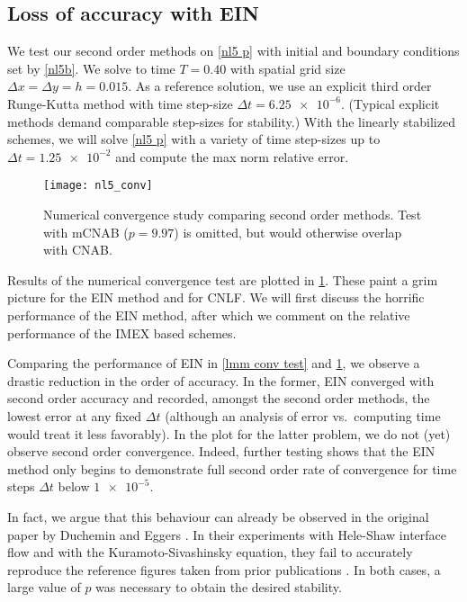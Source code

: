 \subsection{Loss of accuracy with EIN}
We test our second order methods on \cref{nl5 p} with initial and boundary conditions set by \cref{nl5b}. We solve to time $T=0.40$ with spatial grid size $\Delta x = \Delta y = h =0.015$. As a reference solution, we use an explicit third order Runge-Kutta method with time step-size $\Delta t=\num{6.25e-6}$. (Typical explicit methods demand comparable step-sizes for stability.) With the linearly stabilized schemes, we will solve \cref{nl5 p} with a variety of time step-sizes up to $\Delta t = \num{1.25e-2}$ and compute the max norm relative error.

\begin{figure}[htb!]
        \centering
\texttt{[image: nl5\_conv]}
\caption[Numerical convergence study comparing second order methods]{Numerical convergence study comparing second order methods. Test with mCNAB ($p=9.97$) is omitted, but would otherwise overlap with CNAB.}
\label{fig:nl5 conv}
\end{figure}

Results of the numerical convergence test are plotted in \cref{fig:nl5 conv}. These paint a grim picture for the EIN method and for CNLF. We will first discuss the horrific performance of the EIN method, after which we comment on the relative performance of the IMEX based schemes. 

Comparing the performance of EIN in \cref{lmm conv test} and \cref{fig:nl5 conv}, we observe a drastic reduction in the order of accuracy. In the former, EIN converged with second order accuracy and recorded, amongst the second order methods, the lowest error at any fixed $\Delta t$ (although an analysis of error vs.\ computing time would treat it less favorably). In the plot for the latter problem, we do not (yet) observe second order convergence. Indeed, further testing shows that the EIN method only begins to demonstrate full second order rate of convergence for time steps $\Delta t$ below $\num{1e-5}$.

In fact, we argue that this behaviour can already be observed in the original paper by Duchemin and Eggers \cite{duchemin2014explicit}. In their experiments with Hele-Shaw interface flow and with the Kuramoto-Sivashinsky equation, they fail to accurately reproduce the reference figures taken from prior publications \cite{hou1994removing,kassam2005fourth}. In both cases, a large value of $p$ was necessary to obtain the desired stability. 


